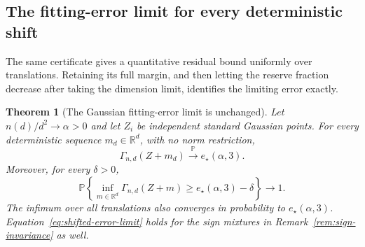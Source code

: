 \documentclass[11pt]{article}
\newcommand{\R}{\mathbb R}
\newcommand{\Pbb}{\mathbb P}
\newtheorem{theorem}{Theorem}[section]
\theoremstyle{remark}
\begin{document}
\subsection{The fitting-error limit for every deterministic shift}
\label{sec:shifted-error}

The same certificate gives a quantitative residual bound uniformly
over translations. Retaining its full margin, and then letting the
reserve fraction decrease after taking the dimension limit, identifies
the limiting error exactly.

\begin{theorem}[The Gaussian fitting-error limit is unchanged]
\label{thm:shifted-error}
Let $n(d)/d^2\to\alpha>0$ and let $Z_i$ be independent standard Gaussian
points. For every deterministic sequence $m_d\in\R^d$, with no norm
restriction,
\begin{equation}\label{eq:shifted-error-limit}
 \Gamma_{n,d}(Z+m_d)\xrightarrow{\Pbb}e_\star(\alpha,3).
\end{equation}
Moreover, for every $\delta>0$,
\begin{equation}\label{eq:uniform-error-lower}
 \Pbb\left\{\inf_{m\in\R^d}\Gamma_{n,d}(Z+m)
                 \ge e_\star(\alpha,3)-\delta\right\}\longrightarrow1.
\end{equation}
The infimum over all translations also converges in probability to
$e_\star(\alpha,3)$. Equation~\eqref{eq:shifted-error-limit} holds for
the sign mixtures in Remark~\ref{rem:sign-invariance} as well.
\end{theorem}
\end{document}
